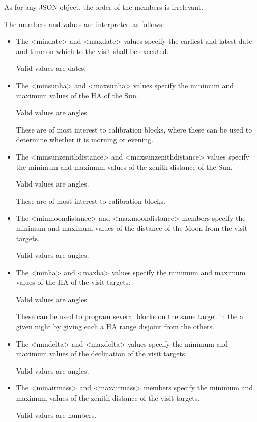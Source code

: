 As for any JSON object, the order of the members is irrelevant.

The members and values are interpreted as follows:

\begin{itemize}

\item The <mindate> and <maxdate> values specify the earliest and latest date and time on which to the visit shall be executed.

Valid values are dates.

\item The <minsunha> and <maxsunha> values specify the minimum and maximum values of the HA of the Sun.

Valid values are angles.

These are of most interest to calibration blocks, where these can be used to determine whether it is morning or evening.

\item The <minsunzenithdistance> and <maxsunzenithdistance> values specify the minimum and maximum values of the zenith distance of the Sun.

Valid values are angles.

These are of most interest to calibration blocks.

\item The <minmoondistance> and <maxmoondistance> members specify the minimum and maximum values of the distance of the Moon from the visit targets.

Valid values are angles.

\item
The <minha> and <maxha> values specify the minimum and maximum values of the HA of the visit targets.

Valid values are angles.

These can be used to program several blocks on the same target in the a given night by giving each a HA range disjoint from the others.

\item
The <mindelta> and <maxdelta> values specify the minimum and maximum values of the declination of the visit targets.

Valid values are angles.

\item 
The <minairmass> and <maxairmass> members specify the minimum and maximum values of the zenith distance of the visit targets.

Valid values are numbers.


\end{itemize}
